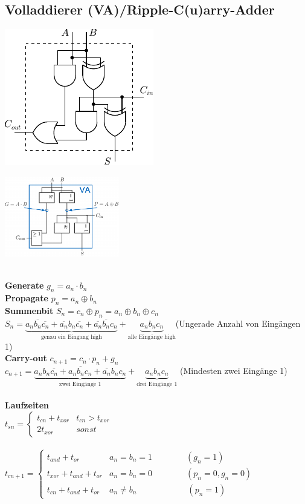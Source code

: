 \documentclass[6pt,a4paper]{scrartcl}
\newcommand{\ol}[1]{\ensuremath{\overline{#1}}}									%
\begin{document}
\begin{multicols*}{3}
\section{Volladdierer (VA)/Ripple-C(u)arry-Adder}
\parbox{5.0cm}{ \includegraphics{./img/ds/volladdierer.pdf} }
\hspace*{-.7cm}\parbox{5.0cm}{ \includegraphics[width=5.0cm]{./img/ds/volladdierer-iec.png} } \\
\textbf{Generate} $g_n = a_n \cdot b_n$\\
\textbf{Propagate} $p_n = a_n \oplus b_n$\\
\textbf{Summenbit} $S_n = c_n \oplus p_n= a_n \oplus b_n \oplus c_n$\\
$S_n = \underbrace{a_n\ol{b_n} \ol{c_n} + \ol{a_n}b_n\ol{c_n} + \ol{a_n}\ol{b_n}c_n}_{\text{genau ein Eingang high}} + \underbrace{a_nb_nc_n}_{\text{alle Eingänge high}}$(Ungerade Anzahl von Eingängen 1) \\
\textbf{Carry-out} $c_{n+1} = c_n \cdot p_n + g_n$\\
$c_{n+1}=\underbrace{a_nb_n\ol{c_n} + a_n\ol{b_n}c_n + \ol{a_n}b_nc_n}_{\text{zwei Eingänge 1}} + \underbrace{a_nb_nc_n}_{\text{drei Eingänge 1}}$ (Mindesten zwei Eingänge 1)
\\ \\
\textbf{Laufzeiten} \\
$t_{sn} = \begin{cases} t_{cn} + t_{xor} & t_{cn} > t_{xor} \\ 2 t_{xor} & sonst \end{cases}$\\ \\
$t_{cn+1} =
\begin{cases}
	t_{and} + t_{or}           & a_n = b_n = 1 \qquad \qquad (g_n=1)   \\
	t_{xor} + t_{and} + t_{or} & a_n = b_n = 0 \qquad \qquad  (p_n = 0, g_n = 0) \\
	t_{cn} + t_{and} + t_{or}  & a_n \ne b_n \qquad \qquad \qquad  (p_n = 1)
\end{cases}$\\

\end{multicols*}
\end{document}
